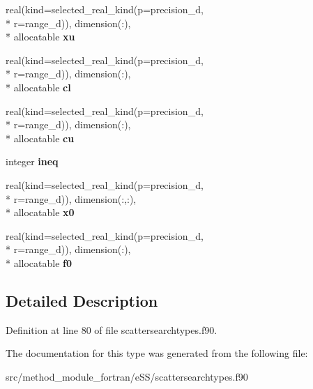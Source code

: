 \begin{DoxyCompactItemize}
\item 
\hypertarget{structscattersearchtypes_1_1problem_a14f821be90f8c960e790019d4f88df03}{real(kind=selected\-\_\-real\-\_\-kind(p=precision\-\_\-d, \\*
r=range\-\_\-d)), dimension(\-:), \\*
allocatable {\bfseries xu}}\label{structscattersearchtypes_1_1problem_a14f821be90f8c960e790019d4f88df03}

\item 
\hypertarget{structscattersearchtypes_1_1problem_a37e15ece533ca91fbff58d04e252358d}{real(kind=selected\-\_\-real\-\_\-kind(p=precision\-\_\-d, \\*
r=range\-\_\-d)), dimension(\-:), \\*
allocatable {\bfseries cl}}\label{structscattersearchtypes_1_1problem_a37e15ece533ca91fbff58d04e252358d}

\item 
\hypertarget{structscattersearchtypes_1_1problem_aea85723ce0416ed5482f40efe9a437f7}{real(kind=selected\-\_\-real\-\_\-kind(p=precision\-\_\-d, \\*
r=range\-\_\-d)), dimension(\-:), \\*
allocatable {\bfseries cu}}\label{structscattersearchtypes_1_1problem_aea85723ce0416ed5482f40efe9a437f7}

\item 
\hypertarget{structscattersearchtypes_1_1problem_a592d1f6d78fa00f755c6f8adc42924ee}{integer {\bfseries ineq}}\label{structscattersearchtypes_1_1problem_a592d1f6d78fa00f755c6f8adc42924ee}

\item 
\hypertarget{structscattersearchtypes_1_1problem_a1ac4d8e62aadc4822dbcba280c3075cb}{real(kind=selected\-\_\-real\-\_\-kind(p=precision\-\_\-d, \\*
r=range\-\_\-d)), dimension(\-:,\-:), \\*
allocatable {\bfseries x0}}\label{structscattersearchtypes_1_1problem_a1ac4d8e62aadc4822dbcba280c3075cb}

\item 
\hypertarget{structscattersearchtypes_1_1problem_a886e361c0668b36a805fd8051212d0e9}{real(kind=selected\-\_\-real\-\_\-kind(p=precision\-\_\-d, \\*
r=range\-\_\-d)), dimension(\-:), \\*
allocatable {\bfseries f0}}\label{structscattersearchtypes_1_1problem_a886e361c0668b36a805fd8051212d0e9}

\end{DoxyCompactItemize}


\subsection{Detailed Description}


Definition at line 80 of file scattersearchtypes.\-f90.



The documentation for this type was generated from the following file\-:\begin{DoxyCompactItemize}
\item 
src/method\-\_\-module\-\_\-fortran/e\-S\-S/scattersearchtypes.\-f90\end{DoxyCompactItemize}
